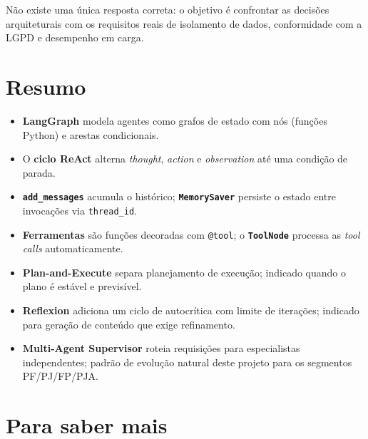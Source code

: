 \noindent N\~ao existe uma \'unica resposta correta: o objetivo \'e
confrontar as decis\~oes arquiteturais com os requisitos reais de
isolamento de dados, conformidade com a LGPD e desempenho em carga.

\section{Resumo}
\label{sec:resumo_cap03}

\begin{itemize}[leftmargin=*]
  \item \textbf{LangGraph} modela agentes como grafos de estado com
        n\'os (fun\c{c}\~oes Python) e arestas condicionais.
  \item O \textbf{ciclo ReAct} alterna \textit{thought},
        \textit{action} e \textit{observation} at\'e uma condi\c{c}\~ao
        de parada.
  \item \textbf{\texttt{add\_messages}} acumula o hist\'orico;
        \textbf{\texttt{MemorySaver}} persiste o estado entre
        invoca\c{c}\~oes via \texttt{thread\_id}.
  \item \textbf{Ferramentas} s\~ao fun\c{c}\~oes decoradas com
        \texttt{@tool}; o \textbf{\texttt{ToolNode}} processa as
        \textit{tool calls} automaticamente.
  \item \textbf{Plan-and-Execute} separa planejamento de
        execu\c{c}\~ao; indicado quando o plano \'e est\'avel e
        previs\'ivel.
  \item \textbf{Reflexion} adiciona um ciclo de autocr\'itica com
        limite de itera\c{c}\~oes; indicado para gera\c{c}\~ao de
        conte\'udo que exige refinamento.
  \item \textbf{Multi-Agent Supervisor} roteia requisi\c{c}\~oes
        para especialistas independentes; padr\~ao de evolu\c{c}\~ao
        natural deste projeto para os segmentos PF/PJ/FP/PJA.
\end{itemize}

\section{Para saber mais}
\label{sec:para_saber_mais_cap03}


